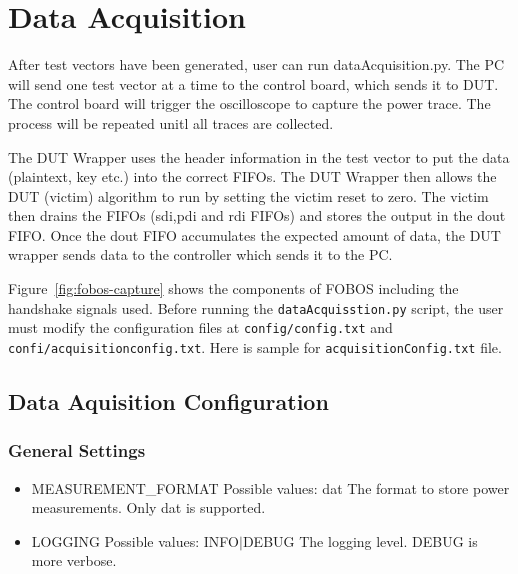 \chapter{Data Acquisition} \label{chap:dataAcquisition}

After test vectors have been generated, user can run dataAcquisition.py. The PC will send one test vector at a time to the control board, which sends it to DUT. 
The control board will trigger the oscilloscope to capture the power trace. The process will be repeated unitl all traces are collected.
 

The DUT Wrapper uses the header information in the test vector to put the data (plaintext, key etc.) into the correct FIFOs. 
The DUT Wrapper then allows the DUT (victim) algorithm to run by setting the victim reset to zero. The victim then drains the FIFOs (sdi,pdi and rdi FIFOs) and stores the output in the dout FIFO. 
Once the dout FIFO accumulates the expected amount of data, the DUT wrapper sends data to the controller which sends it to the PC.

Figure~\ref{fig:fobos-capture} shows the components of FOBOS including the handshake signals used.
Before running the \texttt{dataAcquisstion.py} script, the  user must  modify the configuration files at \texttt{config/config.txt} and \texttt{confi/acquisitionconfig.txt}.
Here is sample for \texttt{acquisitionConfig.txt} file.

\section{Data Aquisition Configuration}

\subsection{General Settings}
\begin{itemize}
 \item MEASUREMENT\_FORMAT \newline
 Possible values: dat \newline
 The format to store power measurements. Only dat is supported.
 \item LOGGING \newline 
 Possible values: INFO$|$DEBUG \newline
 The logging level. DEBUG is more verbose.
\end{itemize}

